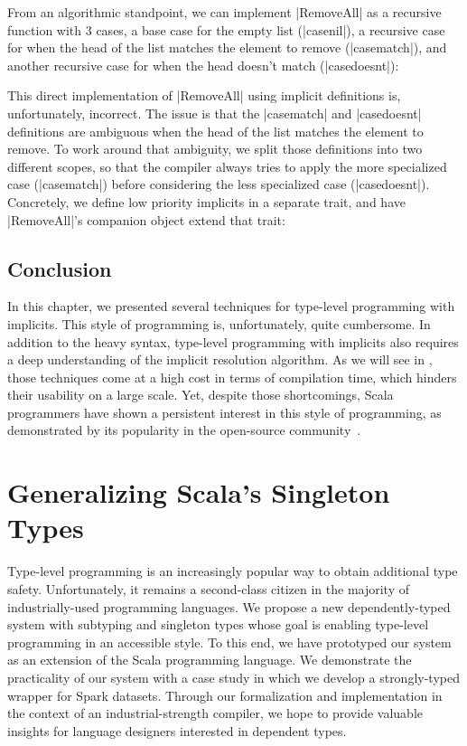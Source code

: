 \removeAllDefinition

From an algorithmic standpoint, we can implement |RemoveAll| as a recursive function with 3 cases, a base case for the empty list (|casenil|), a recursive case for when the head of the list matches the element to remove (|casematch|), and another recursive case for when the head doesn't match (|casedoesnt|):

\removeAllBroken

This direct implementation of |RemoveAll| using implicit definitions is, unfortunately, incorrect.
The issue is that the |casematch| and |casedoesnt| definitions are ambiguous when the head of the list matches the element to remove.
To work around that ambiguity, we split those definitions into two different scopes, so that the compiler always tries to apply the more specialized case (|casematch|) before considering the less specialized case (|casedoesnt|).
Concretely, we define low priority implicits in a separate trait, and have |RemoveAll|'s companion object extend that trait:

\removeAllPrioritized

\section{Conclusion}

In this chapter, we presented several techniques for type-level programming with implicits.
This style of programming is, unfortunately, quite cumbersome.
In addition to the heavy syntax, type-level programming with implicits also requires a deep understanding of the implicit resolution algorithm.
As we will see in , those techniques come at a high cost in terms of compilation time, which hinders their usability on a large scale.
Yet, despite those shortcomings, Scala programmers have shown a persistent interest in this style of programming, as demonstrated by its popularity in the open-source community~\citep{sabin2011shapeless, pilquist2013scodecs, blanvillain2016frameless}.

\chapter{Generalizing Scala's Singleton Types}
\label{chap:generalizing-scala-s-singleton-types}

Type-level programming is an increasingly popular way to obtain additional type safety.
Unfortunately, it remains a second-class citizen in the majority of industrially-used programming languages.
We propose a new dependently-typed system with subtyping and singleton types whose goal is enabling type-level programming in an accessible style.
To this end, we have prototyped our system as an extension of the Scala programming language.
We demonstrate the practicality of our system with a case study in which we develop a strongly-typed wrapper for Spark datasets.
Through our formalization and implementation in the context of an industrial-strength compiler, we hope to provide valuable insights for language designers interested in dependent types.


